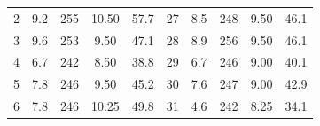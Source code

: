 \documentclass[12pt,B5paper,]{book}
\begin{document}
\begin{table}[H]
\begin{tabular}{ccccc|ccccc}
2                    & 9.2                                                      & 255                                                       & 10.50                                                     & 57.7                                                     & 27                   & 8.5                                                      & 248                                                       & 9.50                                                      & 46.1                                                     \\
3                    & 9.6                                                      & 253                                                       & 9.50                                                      & 47.1                                                     & 28                   & 8.9                                                      & 256                                                       & 9.50                                                      & 46.1                                                     \\
4                    & 6.7                                                      & 242                                                       & 8.50                                                      & 38.8                                                     & 29                   & 6.7                                                      & 246                                                       & 9.00                                                      & 40.1                                                     \\
5                    & 7.8                                                      & 246                                                       & 9.50                                                      & 45.2                                                     & 30                   & 7.6                                                      & 247                                                       & 9.00                                                      & 42.9                                                     \\
6                    & 7.8                                                      & 246                                                       & 10.25                                                     & 49.8                                                     & 31                   & 4.6                                                      & 242                                                       & 8.25                                                      & 34.1                                                     \\

\end{tabular}
\end{table}
\end{document}

